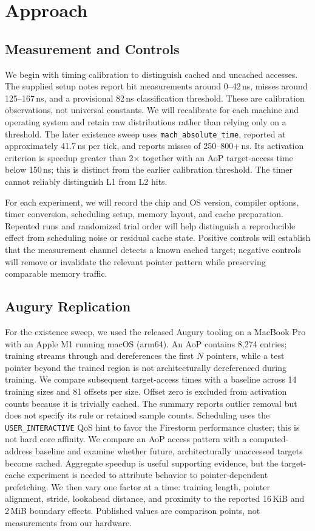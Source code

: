 \section{Approach}
\subsection{Measurement and Controls}
We begin with timing calibration to distinguish cached and uncached accesses. The supplied setup notes report hit measurements around 0--42\,ns, misses around 125--167\,ns, and a provisional 82\,ns classification threshold. These are calibration observations, not universal constants. We will recalibrate for each machine and operating system and retain raw distributions rather than relying only on a threshold. The later existence sweep uses \texttt{mach\_absolute\_time}, reported at approximately 41.7\,ns per tick, and reports misses of 250--800+\,ns. Its activation criterion is speedup greater than 2$\times$ together with an AoP target-access time below 150\,ns; this is distinct from the earlier calibration threshold. The timer cannot reliably distinguish L1 from L2 hits.

For each experiment, we will record the chip and OS version, compiler options, timer conversion, scheduling setup, memory layout, and cache preparation. Repeated runs and randomized trial order will help distinguish a reproducible effect from scheduling noise or residual cache state. Positive controls will establish that the measurement channel detects a known cached target; negative controls will remove or invalidate the relevant pointer pattern while preserving comparable memory traffic.

\subsection{Augury Replication}
For the existence sweep, we used the released Augury tooling on a MacBook Pro with an Apple M1 running macOS (arm64). An AoP contains 8,274 entries; training streams through and dereferences the first $N$ pointers, while a test pointer beyond the trained region is not architecturally dereferenced during training. We compare subsequent target-access times with a baseline across 14 training sizes and 81 offsets per size. Offset zero is excluded from activation counts because it is trivially cached. The summary reports outlier removal but does not specify its rule or retained sample counts. Scheduling uses the \texttt{USER\_INTERACTIVE} QoS hint to favor the Firestorm performance cluster; this is not hard core affinity. We compare an AoP access pattern with a computed-address baseline and examine whether future, architecturally unaccessed targets become cached. Aggregate speedup is useful supporting evidence, but the target-cache experiment is needed to attribute behavior to pointer-dependent prefetching. We then vary one factor at a time: training length, pointer alignment, stride, lookahead distance, and proximity to the reported 16\,KiB and 2\,MiB boundary effects. Published values are comparison points, not measurements from our hardware.

